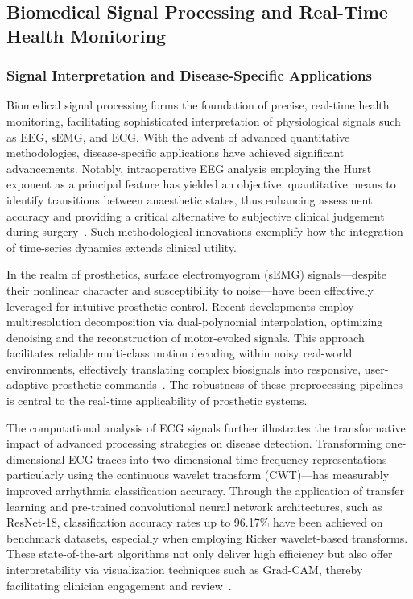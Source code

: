 \subsection{Biomedical Signal Processing and Real-Time Health Monitoring}

\subsubsection{Signal Interpretation and Disease-Specific Applications}

Biomedical signal processing forms the foundation of precise, real-time health monitoring, facilitating sophisticated interpretation of physiological signals such as EEG, sEMG, and ECG. With the advent of advanced quantitative methodologies, disease-specific applications have achieved significant advancements. Notably, intraoperative EEG analysis employing the Hurst exponent as a principal feature has yielded an objective, quantitative means to identify transitions between anaesthetic states, thus enhancing assessment accuracy and providing a critical alternative to subjective clinical judgement during surgery~\cite{ref96}. Such methodological innovations exemplify how the integration of time-series dynamics extends clinical utility.

In the realm of prosthetics, surface electromyogram (sEMG) signals—despite their nonlinear character and susceptibility to noise—have been effectively leveraged for intuitive prosthetic control. Recent developments employ multiresolution decomposition via dual-polynomial interpolation, optimizing denoising and the reconstruction of motor-evoked signals. This approach facilitates reliable multi-class motion decoding within noisy real-world environments, effectively translating complex biosignals into responsive, user-adaptive prosthetic commands~\cite{ref97}. The robustness of these preprocessing pipelines is central to the real-time applicability of prosthetic systems.

The computational analysis of ECG signals further illustrates the transformative impact of advanced processing strategies on disease detection. Transforming one-dimensional ECG traces into two-dimensional time-frequency representations—particularly using the continuous wavelet transform (CWT)—has measurably improved arrhythmia classification accuracy. Through the application of transfer learning and pre-trained convolutional neural network architectures, such as ResNet-18, classification accuracy rates up to 96.17\% have been achieved on benchmark datasets, especially when employing Ricker wavelet-based transforms. These state-of-the-art algorithms not only deliver high efficiency but also offer interpretability via visualization techniques such as Grad-CAM, thereby facilitating clinician engagement and review~\cite{ref101}.

